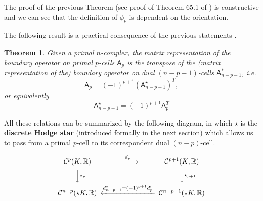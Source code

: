 \documentclass{article}
\theoremstyle{definition} %
\theoremstyle{plain} %
\newtheorem{Th}{Theorem}
\theoremstyle{remark} %
\newcommand{\rr}{\mathbb{R}}
\begin{document}
The proof of the previous Theorem (see proof of Theorem 65.1 of \cite{munkres2018elements}) is constructive and we can see that the definition of $\phi_p$ is dependent on the orientation. 

The following result is a practical consequence of the previous statements \cite{schulz2020convergence, desbrun2005discrete}.

\begin{Th}
     Given a primal $n$-complex, the matrix representation of the boundary operator on primal $p$-cells $\mathsf{A}_p$ is the transpose of the (matrix representation of the) boundary operator on dual $(n - p - 1)$-cells ${\mathsf{A}^*_{n-p-1}}$, \textit{i.e.}
     \begin{equation}
         \mathsf{A}_p = (-1)^{p+1}( {\mathsf{A}^{\star}_{n-p-1}})^T,
     \end{equation}
     or equivalently
     \begin{equation}
         \mathsf{A}^\star_{n-p-1} = (-1)^{p+1} \mathsf{A}^T_p
     \end{equation}
\end{Th}

All these relations can be summarized by the following diagram, in which $\star$ is the \textbf{discrete Hodge star} (introduced formally in the next section) which allows us to pass from a primal $p$-cell to its correspondent dual $(n-p)$-cell.

$$\begin{CD}
\mathcal{C}^p(K, \rr)   @>d_p>>   \mathcal{C}^{p+1}(K, \rr)\\
@VV\star_pV       @VV\star_{p+1}V\\
\mathcal{C}^{n-p}(\star K, \rr)   @<d_{n-p-1}^\star = (-1)^{p+1}d^t_p<<   \mathcal{C}^{n-p-1}(\star K, \rr)\\
\end{CD}$$
\end{document}
